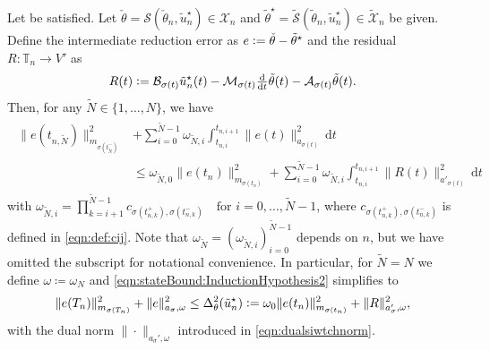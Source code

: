 \documentclass[reqno]{amsart}
\newcommand{\MK}[1]{{\color{magenta}#1\textsuperscript{MK}}}
\newcommand{\ReA}[1]{{\color{black}#1}}
\newcommand{\X}{{\mathscr X}}
\newcommand{\timeInt}{\mathbb{T}}
\newcommand{\state}{\theta}
\newcommand{\inpVar}{u}
\newcommand{\dt}{\,\mathrm{d}t}
\newcommand{\ddt}{\tfrac{\mathrm{d}}{\mathrm{d}t}}
\newcommand{\mOper}{\calM}
\newcommand{\aOper}{\calA}
\newcommand{\bOper}{\calB}
\newcommand{\solper}{\calS}
\newcommand{\intermediateInitState}{\intermediateState_n}%
\newcommand{\switch}{\sigma}
\newcommand{\nrSwitches}{N}
\newcommand{\reduce}[1]{\tilde{#1}}
\newcommand{\Xred}{\reduce{\X}}
\newcommand{\err}{e}
\newcommand{\residual}{R}
\newcommand{\stateRed}{\reduce{\state}}
\newcommand{\optStateRed}{\stateRed^\star}
\newcommand{\optInpVarRed}[1]{\reduce{\inpVar}_{#1}^\star}
\newcommand{\optInpVarRedN}{\optInpVarRed{n}}
\newcommand{\intermediateState}{\check{\state}}
\newcommand{\calA}{\mathcal{A}}
\newcommand{\calB}{\mathcal{B}}
\newcommand{\calM}{\mathcal{M}}
\newcommand{\calS}{\mathcal{S}}
\begin{document}
\begin{lemma}
\label{thm:errorBoundStateEnergy}
%
    Let  be satisfied. Let $\intermediateState=\solper(\intermediateInitState,\optInpVarRedN)\in \X_n$ and $\optStateRed=\reduce\solper(\stateRed_n,\optInpVarRedN) \in \Xred_n$ be given. 
    Define the intermediate reduction error as $\err \vcentcolon= \intermediateState - \optStateRed$ and the residual $\residual\colon \timeInt_n\to V'$ as
%
\begin{align*}
		\residual(t) \vcentcolon= \bOper_{\switch(t)}\optInpVarRedN(t) - \mOper_{\switch(t)}\ddt{\stateRed}(t) - \aOper_{\switch(t)}\stateRed(t).
\end{align*}
%
Then, for any $\tilde{\nrSwitches}\in\{1,\ldots,\nrSwitches\}$, we have 
%    
\begin{align} \label{eqn:stateBound:InductionHypothesis2}
    \begin{aligned}
    \|e(t_{n,\tilde \nrSwitches})\|_{m_{\switch(t^{-}_{\tilde \nrSwitches})}}^2 &+ \sum\limits_{i=0}^{\tilde \nrSwitches-1}\omega_{\tilde \nrSwitches,i}\int_{t_{n,i}}^{t_{n,i+1}}\|e(t)\|_{a_{\switch(t)}}^2 \dt \\
    &\leq   
    \omega_{\tilde\nrSwitches,0 } \|e(t_n)\|_{m_{\switch(t_n)}}^2 
    + \sum\limits_{i=0}^{\tilde \nrSwitches-1}\omega_{\tilde \nrSwitches,i}\int_{t_{n,i}}^{t_{n,i+1}}\|\residual(t)\|_{{a'_{\switch(t)}}}^2 \dt
    \end{aligned}
\end{align}
%
with $\omega_{\tilde \nrSwitches,i} = \prod_{k=i+1}^{\tilde \nrSwitches-1}c_{\switch(t^{+}_{n,k}),\switch(t^-_{n,k})} \quad \text{for }i=0,\ldots,\tilde \nrSwitches-1$,
where $c_{\switch(t^{+}_{n,k}),\switch(t^-_{n,k})}$ is defined in \eqref{eqn:def:cij}. Note that $\omega_{\tilde \nrSwitches}=(\omega_{\tilde \nrSwitches,i})_{i=0}^{\tilde \nrSwitches-1}$ depends on $n$, but we have omitted the subscript for notational convenience. In particular, for $\tilde \nrSwitches=\nrSwitches$ we define $\omega\coloneqq \omega_N$ and \eqref{eqn:stateBound:InductionHypothesis2} simplifies to
%
\begin{align}
    \label{eqn:stateBound:Venergy}
    \|e(T_n)\|_{m_{\switch(T_n)}}^2 +  \|\err\|_{a_{\switch},\omega}^2 
    \leq \Delta^2_{\state}(\optInpVarRedN) \vcentcolon=\omega_0 \|\err(t_n)\|_{m_{\switch(t_n)}}^2 + \|\residual\|_{a_{\switch}',\omega}^2,
\end{align}
%
\ReA{with the dual norm $\|\cdot\|_{a_{\switch}',\omega}$ introduced in \eqref{eqn:dualsiwtchnorm}.}
% 
\end{lemma}
\end{document}
